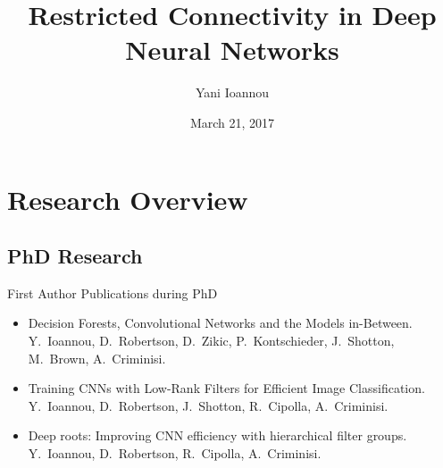 \documentclass[t,xcolor=dvipsnames]{beamer}
\title[Restricted Connectivity in Deep Neural Networks] %
{Restricted Connectivity in Deep Neural Networks}
\author[Yani Ioannou]
{Yani Ioannou}
\institute[University of Cambridge] %
{University of Cambridge}
\date{March 21, 2017}
\begin{document}


\begin{frame}
  \titlepage
\end{frame}






\section{Research Overview}

\subsection{PhD Research}

\begin{frame}{First Author Publications during PhD}
\begin{itemize}
    \item Decision Forests, Convolutional Networks and the Models in-Between.\\{\footnotesize Y.\ Ioannou, D.\ Robertson, D.\ Zikic, P.\ Kontschieder, J.\ Shotton, M.\ Brown, A.\ Criminisi.}%
    \item Training CNNs with Low-Rank Filters for Efficient Image Classification.\\{\footnotesize Y.\ Ioannou, D.\ Robertson, J.\ Shotton, R.\ Cipolla, A.\ Criminisi.}%
    \item Deep roots: Improving CNN efficiency with hierarchical filter groups.\\{\footnotesize Y.\ Ioannou, D.\ Robertson, R.\ Cipolla, A.\ Criminisi.}%
    
\end{itemize}
\end{frame}
\end{document}
